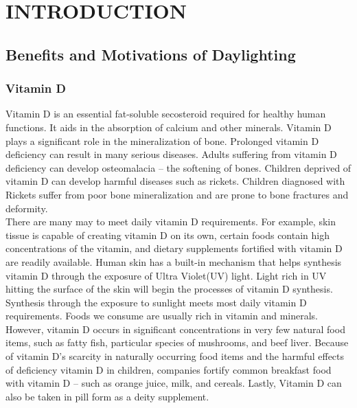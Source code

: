 
\chapter{INTRODUCTION} \label{sec:introduction}


\section{Benefits and Motivations of Daylighting}

	\subsection{Vitamin D}
		Vitamin D is an essential fat-soluble secosteroid required for healthy human functions. It aids in the absorption of calcium and other minerals. Vitamin D plays a significant role in the mineralization of bone\cite{Ross}.   
		Prolonged vitamin D deficiency can result in many serious diseases.
		Adults suffering from vitamin D deficiency can develop osteomalacia -- the softening of bones. Children deprived of vitamin D can develop harmful diseases such as rickets. Children diagnosed with Rickets suffer from poor bone mineralization and are prone to bone fractures and deformity\cite{Pettifor}. \\

		There are many may to meet daily vitamin D requirements. For example, skin tissue is capable of creating vitamin D on its own, certain foods contain high concentrations of the vitamin, and dietary supplements fortified with vitamin D are readily available\cite{Ross}.
		Human skin has a built-in mechanism that helps synthesis vitamin D through the exposure of Ultra Violet(UV) light. Light rich in UV hitting the surface of the skin will begin the processes of vitamin D synthesis. Synthesis through the exposure to sunlight meets most daily vitamin D requirements. Foods we consume are usually rich in vitamin and minerals. However, vitamin D occurs in significant concentrations in very few natural food items, such as fatty fish, particular species of mushrooms, and beef liver.  Because of vitamin D's scarcity in naturally occurring food items and the harmful effects of deficiency vitamin D  in children, companies fortify common breakfast food with vitamin D -- such as orange juice, milk, and cereals. Lastly, Vitamin D can also be taken in pill form as a deity supplement. \\


